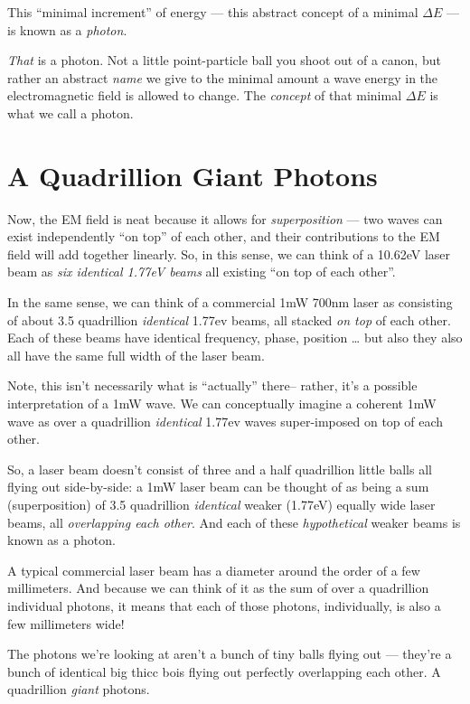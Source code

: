 \documentclass[]{article}
\begin{document}
This ``minimal increment'' of energy --- this abstract concept of a minimal
\(\Delta E\) --- is known as a \emph{photon}.

\emph{That} is a photon. Not a little point-particle ball you shoot out of a
canon, but rather an abstract \emph{name} we give to the minimal amount a wave
energy in the electromagnetic field is allowed to change. The \emph{concept} of
that minimal \(\Delta E\) is what we call a photon.

\section{A Quadrillion Giant Photons}\label{a-quadrillion-giant-photons}

Now, the EM field is neat because it allows for \emph{superposition} --- two
waves can exist independently ``on top'' of each other, and their contributions
to the EM field will add together linearly. So, in this sense, we can think of a
10.62eV laser beam as \emph{six identical 1.77eV beams} all existing ``on top of
each other''.

In the same sense, we can think of a commercial 1mW 700nm laser as consisting of
about 3.5 quadrillion \emph{identical} 1.77ev beams, all stacked \emph{on top}
of each other. Each of these beams have identical frequency, phase, position
\ldots{} but also they also all have the same full width of the laser beam.

Note, this isn't necessarily what is ``actually'' there-- rather, it's a
possible interpretation of a 1mW wave. We can conceptually imagine a coherent
1mW wave as over a quadrillion \emph{identical} 1.77ev waves super-imposed on
top of each other.

So, a laser beam doesn't consist of three and a half quadrillion little balls
all flying out side-by-side: a 1mW laser beam can be thought of as being a sum
(superposition) of 3.5 quadrillion \emph{identical} weaker (1.77eV) equally wide
laser beams, all \emph{overlapping each other}. And each of these
\emph{hypothetical} weaker beams is known as a photon.

A typical commercial laser beam has a diameter around the order of a few
millimeters. And because we can think of it as the sum of over a quadrillion
individual photons, it means that each of those photons, individually, is also a
few millimeters wide!

The photons we're looking at aren't a bunch of tiny balls flying out --- they're
a bunch of identical big thicc bois flying out perfectly overlapping each other.
A quadrillion \emph{giant} photons.
\end{document}
